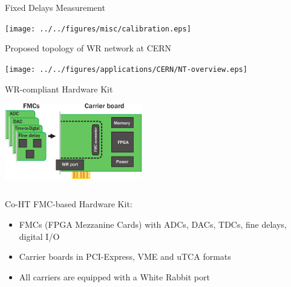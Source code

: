\documentclass[compress,red]{beamer}
\begin{document}
\begin{frame}{Fixed Delays Measurement}

  \begin{center}
  \texttt{[image: ../../figures/misc/calibration.eps]}
  \end{center}

\end{frame}
\begin{frame}{Proposed topology of WR network at CERN}

    \begin{center}
    \texttt{[image: ../../figures/applications/CERN/NT-overview.eps]}
    \end{center}

\end{frame}
\begin{frame}{WR-compliant Hardware Kit}

    \begin{center}
    \includegraphics[width=6cm]{../../figures/node/shw_kit}
    \end{center}

  \begin{columns}[c]

	\begin{block}{Co-HT FMC-based Hardware Kit:}
	  \begin{itemize}
	  \item FMCs (FPGA Mezzanine Cards) with ADCs, DACs, TDCs, fine delays, digital I/O
	  \item Carrier boards in PCI-Express, VME and uTCA formats
	  \item All carriers are equipped with a White Rabbit port
	  \end{itemize}
	\end{block}

  \end{columns}


\end{frame}
\end{document}
